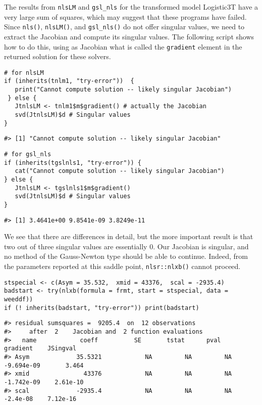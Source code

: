 The results from \texttt{nlsLM} and \texttt{gsl\_nls} for the transformed model Logistic3T have a very
large sum of squares, which may suggest that these programs have failed.
Since \texttt{nls()}, \texttt{nlsLM()}, and \texttt{gsl\_nls()} do not
offer singular values, we need to extract the Jacobian and compute its
singular values. The following script shows how to do this, using as Jacobian what is called
the \texttt{gradient} element in the returned solution for these solvers.

\begin{verbatim}
# for nlsLM
if (inherits(tnlm1, "try-error"))  {
   print("Cannot compute solution -- likely singular Jacobian")
 } else {  
   JtnlsLM <- tnlm1$m$gradient() # actually the Jacobian
   svd(JtnlsLM)$d # Singular values
}   
\end{verbatim}

\begin{verbatim}
#> [1] "Cannot compute solution -- likely singular Jacobian"
\end{verbatim}

\begin{verbatim}
# for gsl_nls
if (inherits(tgslnls1, "try-error")) {
   cat("Cannot compute solution -- likely singular Jacobian")
} else {  
   JtnlsLM <- tgslnls1$m$gradient()
   svd(JtnlsLM)$d # Singular values
}   
\end{verbatim}

\begin{verbatim}
#> [1] 3.4641e+00 9.8541e-09 3.8249e-11
\end{verbatim}

We see that there are differences in detail, but the more important result is that
two out of three singular values are essentially 0. Our Jacobian is singular, and no
method of the Gauss-Newton type should be able to continue. Indeed, from the parameters
reported at this saddle point, \texttt{nlsr::nlxb()} cannot proceed.

\begin{verbatim}
stspecial <- c(Asym = 35.532,  xmid = 43376,  scal = -2935.4)
badstart <- try(nlxb(formula = frmt, start = stspecial, data = weeddf))
if (! inherits(badstart, "try-error")) print(badstart)
\end{verbatim}

\begin{verbatim}
#> residual sumsquares =  9205.4  on  12 observations
#>     after  2    Jacobian and  2 function evaluations
#>   name            coeff          SE       tstat      pval      gradient    JSingval   
#> Asym             35.5321            NA         NA         NA  -9.694e-09       3.464  
#> xmid               43376            NA         NA         NA  -1.742e-09    2.61e-10  
#> scal             -2935.4            NA         NA         NA    -2.4e-08    7.12e-16
\end{verbatim}

